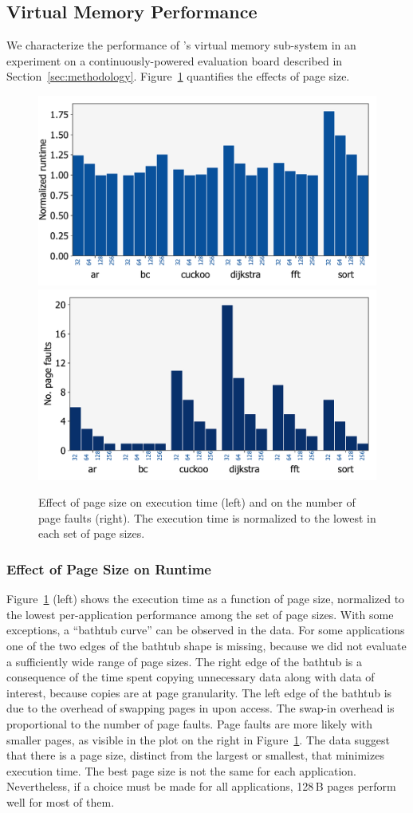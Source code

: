 \subsection{Virtual Memory Performance}
\label{sec:results_memory_management}

We characterize the performance of \sys's virtual memory sub-system in an
experiment on a continuously-powered evaluation board described in
Section~\ref{sec:methodology}.  Figure~\ref{fig:page_size} quantifies the
effects of page size.


\begin{figure}
	\centering
	\includegraphics[width=0.49\columnwidth]{figures/page_exec-time}
	\includegraphics[width=0.49\columnwidth]{figures/pagePulls}
    \caption{Effect of page size on execution time (left) and on the number of
page faults (right). The execution time is normalized to the lowest in each set
of page sizes.}
	\label{fig:page_size}
\end{figure}


\subsubsection{Effect of Page Size on Runtime}

Figure~\ref{fig:page_size} (left) shows the execution time as a function
of page size, normalized to the lowest per-application performance among the
set of page sizes.
%
With some exceptions, a ``bathtub curve'' can be observed in the data.  For
some applications one of the two edges of the bathtub shape is missing, because
we did not evaluate a sufficiently wide range of page sizes.
%
The right edge of the bathtub is a consequence of the time spent copying
unnecessary data along with data of interest, because copies are at page
granularity.
%
The left edge of the bathtub is due to the overhead of swapping pages in
upon access.
%
The swap-in overhead is proportional to the number of page faults.
%
Page faults are more likely with smaller pages, as visible in the plot on the
right in Figure~\ref{fig:page_size}.
%
The data suggest that there is a page size, distinct from the largest or
smallest, that minimizes execution time. The best page size is not the same for
each application. Nevertheless, if a choice must be made for all applications,
128\,B pages perform well for most of them.


